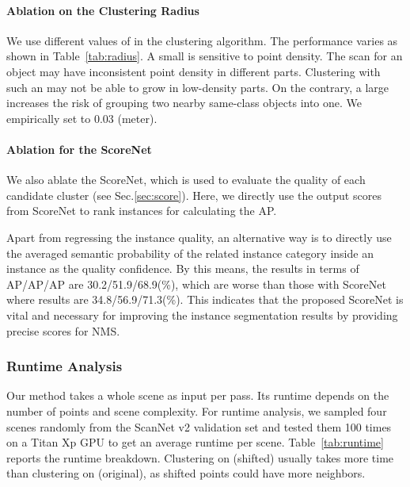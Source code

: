 \documentclass[10pt,twocolumn,letterpaper]{article}
\begin{document}
\vspace*{-3mm}
\paragraph{Ablation on the Clustering Radius }
We use different values of  in the clustering algorithm. 
The performance varies as shown in Table~\ref{tab:radius}. A small  is sensitive to point density. The scan for an object may have inconsistent point density in different parts. Clustering with such an  may not be able to grow in low-density parts. On the contrary, a large  increases the risk of grouping two nearby same-class objects into one. We empirically set  to 0.03 (meter).

\paragraph{Ablation for the ScoreNet}
We also ablate the ScoreNet, which is used to evaluate the quality of each candidate cluster (see Sec.\ref{sec:score}). 
Here, we directly use the output scores from ScoreNet to rank instances for calculating the AP. 

Apart from regressing the instance quality, an alternative way is to directly use the averaged semantic probability of the related instance category inside an instance as the quality confidence. 
By this means, the results in terms of AP/AP/AP are 30.2/51.9/68.9(\%), which are worse than those with ScoreNet where results are 34.8/56.9/71.3(\%). This indicates that the proposed ScoreNet is vital and necessary for improving the instance segmentation results  by providing precise scores for NMS.

\subsubsection{Runtime Analysis}
Our method takes a whole scene as input per pass. Its runtime depends on the number of points and scene complexity. For runtime analysis, we sampled four scenes randomly from the ScanNet v2 validation set and tested them 100 times on a Titan Xp GPU to get an average runtime per scene. Table~\ref{tab:runtime} reports the runtime breakdown.
Clustering on  (shifted) usually takes more time than clustering on  (original), as shifted points could have more neighbors.
\end{document}
